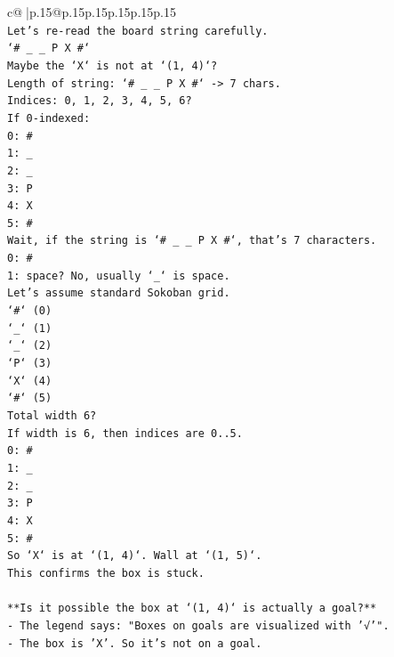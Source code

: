 \documentclass{article}
\begin{document}
{\begin{supertabular}{c@{$\;$}|p{.15\linewidth}@{}p{.15\linewidth}p{.15\linewidth}p{.15\linewidth}p{.15\linewidth}p{.15\linewidth}}
{{{\\ 
\texttt{Let's re{-}read the board string carefully.} \\
\texttt{`\# \_ \_ P X \#`} \\
\texttt{Maybe the `X` is not at `(1, 4)`?} \\
\texttt{Length of string: `\# \_ \_ P X \#` {-}> 7 chars.} \\
\texttt{Indices: 0, 1, 2, 3, 4, 5, 6?} \\
\texttt{If 0{-}indexed:} \\
\texttt{0: \#} \\
\texttt{1: \_} \\
\texttt{2: \_} \\
\texttt{3: P} \\
\texttt{4: X} \\
\texttt{5: \#} \\
\texttt{Wait, if the string is `\# \_ \_ P X \#`, that's 7 characters.} \\
\texttt{0: \#} \\
\texttt{1: space? No, usually `\_` is space.} \\
\texttt{Let's assume standard Sokoban grid.} \\
\texttt{`\#` (0)} \\
\texttt{`\_` (1)} \\
\texttt{`\_` (2)} \\
\texttt{`P` (3)} \\
\texttt{`X` (4)} \\
\texttt{`\#` (5)} \\
\texttt{Total width 6?} \\
\texttt{If width is 6, then indices are 0..5.} \\
\texttt{0: \#} \\
\texttt{1: \_} \\
\texttt{2: \_} \\
\texttt{3: P} \\
\texttt{4: X} \\
\texttt{5: \#} \\
\texttt{So `X` is at `(1, 4)`. Wall at `(1, 5)`.} \\
\texttt{This confirms the box is stuck.} \\
\\ 
\texttt{**Is it possible the box at `(1, 4)` is actually a goal?**} \\
\texttt{{-} The legend says: "Boxes on goals are visualized with '√'".} \\
\texttt{{-} The box is 'X'. So it's not on a goal.} \\
}}}
\end{supertabular}}
\end{document}
